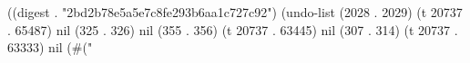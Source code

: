 
((digest . "2bd2b78e5a5e7c8fe293b6aa1c727c92") (undo-list (2028 . 2029) (t 20737 . 65487) nil (325 . 326) nil (355 . 356) (t 20737 . 63445) nil (307 . 314) (t 20737 . 63333) nil (#("%
